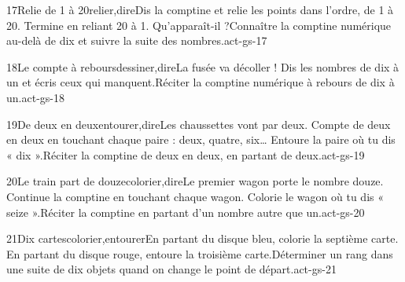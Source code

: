 \begin{activite}{17}{Relie de 1 à 20}{relier,dire}{Dis la comptine et relie les points dans l’ordre, de 1 à 20. Termine en reliant 20 à 1. Qu’apparaît-il ?}{Connaître la comptine numérique au-delà de dix et suivre la suite des nombres.}{act-gs-17}
\end{activite}
\begin{activite}{18}{Le compte à rebours}{dessiner,dire}{La fusée va décoller ! Dis les nombres de dix à un et {\otBold\color{otNavy}écris} ceux qui manquent.}{Réciter la comptine numérique à rebours de dix à un.}{act-gs-18}
\end{activite}
\begin{activite}{19}{De deux en deux}{entourer,dire}{Les chaussettes vont par deux. Compte de deux en deux en touchant chaque paire : deux, quatre, six… {\otBold\color{otNavy}Entoure} la paire où tu dis « dix ».}{Réciter la comptine de deux en deux, en partant de deux.}{act-gs-19}
\end{activite}
\begin{activite}{20}{Le train part de douze}{colorier,dire}{Le premier wagon porte le nombre douze. Continue la comptine en touchant chaque wagon. Colorie le wagon où tu dis « {\otBold\color{otNavy}seize} ».}{Réciter la comptine en partant d’un nombre autre que un.}{act-gs-20}
\end{activite}
\begin{activite}{21}{Dix cartes}{colorier,entourer}{En partant du disque {\otBold\color{otNavy}bleu}, colorie la septième carte. En partant du disque {\otBold\color{otNavy}rouge}, entoure la troisième carte.}{Déterminer un rang dans une suite de dix objets quand on change le point de départ.}{act-gs-21}
\end{activite}
